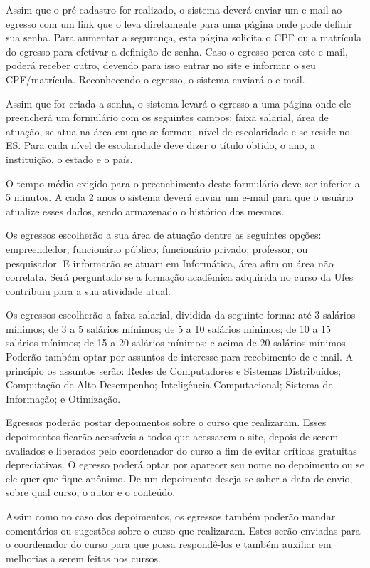 Assim que o pré-cadastro for realizado, o sistema deverá enviar um e-mail ao egresso com um link que o leva diretamente para uma página onde pode definir sua senha. Para aumentar a segurança, esta página solicita o CPF ou a matrícula do egresso para efetivar a definição de senha. Caso o egresso perca este e-mail, poderá receber outro, devendo para isso entrar no site e informar o seu CPF/matrícula. Reconhecendo o egresso, o sistema enviará o e-mail.
 
Assim que for criada a senha, o sistema levará o egresso a uma página onde ele preencherá um formulário com os seguintes campos: faixa salarial, área de atuação, se atua na área em que se formou, nível de escolaridade e se reside no ES. Para cada nível de escolaridade deve dizer o título obtido, o ano, a instituição, o estado e o país.

O tempo médio exigido para o preenchimento deste formulário deve ser inferior a 5 minutos. A cada 2 anos o sistema deverá enviar um e-mail para que o usuário atualize esses dados, sendo armazenado o histórico dos mesmos.

Os egressos escolherão a sua área de atuação dentre as seguintes opções: empreendedor; funcionário público; funcionário privado; professor; ou pesquisador. E informarão se atuam em Informática, área afim ou área não correlata. Será perguntado se a formação acadêmica adquirida no curso da Ufes contribuiu para a sua atividade atual.

Os egressos escolherão a faixa salarial, dividida da seguinte forma: até 3 salários mínimos; de 3 a 5 salários mínimos; de 5 a 10 salários mínimos;  de 10 a 15 salários mínimos; de 15 a 20 salários mínimos; e acima de 20 salários mínimos. Poderão também optar por assuntos de interesse para recebimento de e-mail. A princípio os assuntos serão: Redes de Computadores e Sistemas Distribuídos; Computação de Alto Desempenho; Inteligência Computacional; Sistema de Informação; e Otimização. 

Egressos poderão postar depoimentos sobre o curso que realizaram. Esses depoimentos ficarão acessíveis a todos que acessarem o site, depois de serem avaliados e liberados pelo coordenador do curso a fim de evitar críticas gratuitas depreciativas. O egresso poderá optar por aparecer seu nome no depoimento ou se ele quer que fique anônimo. De um depoimento deseja-se saber a data de envio, sobre qual curso, o autor e o conteúdo. 

Assim como no caso dos depoimentos, os egressos também poderão mandar comentários ou sugestões sobre o curso que realizaram. Estes serão enviadas para o coordenador do curso para que possa respondê-los e também auxiliar em melhorias a serem feitas nos cursos. 

